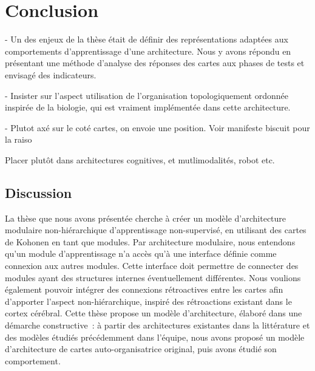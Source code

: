 \chapter*{Conclusion}

- Un des enjeux de la thèse était de définir des représentations adaptées aux comportements d'apprentissage d'une architecture. Nous y avons répondu en présentant une méthode d'analyse des réponses des cartes aux phases de tests et envisagé des indicateurs.

- Insister sur l'aspect utilisation de l'organisation topologiquement ordonnée inspirée de la biologie, qui est vraiment implémentée dans cette architecture.

- Plutot axé sur le coté cartes, on envoie une position. Voir manifeste biscuit pour la raiso

Placer plutôt dans architectures cognitives, et mutlimodalités, robot etc.


\section*{Discussion}

La thèse que nous avons présentée cherche à créer un modèle d'architecture modulaire non-hiérarchique d'apprentissage non-supervisé, en utilisant des cartes de Kohonen en tant que modules.
Par architecture modulaire, nous entendons qu'un module d'apprentissage n'a accès qu'à une interface définie comme connexion aux autres modules. Cette interface doit permettre de connecter des modules ayant des structures internes éventuellement différentes.
Nous voulions également pouvoir intégrer des connexions rétroactives entre les cartes afin d'apporter l'aspect non-hiérarchique, inspiré des rétroactions existant dans le cortex cérébral.
Cette thèse propose un modèle d'architecture, élaboré dans une démarche constructive~: à partir des architectures existantes dans la littérature et des modèles étudiés précédemment dans l'équipe, nous avons proposé un modèle d'architecture de cartes auto-organisatrice original, puis avons étudié son comportement.

